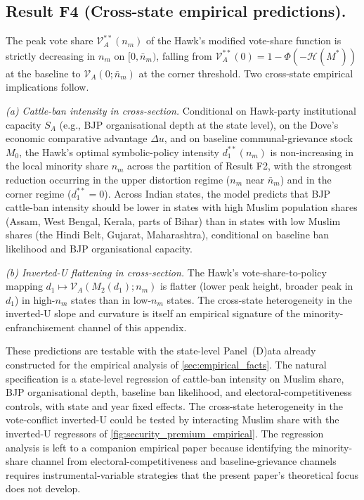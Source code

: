 \documentclass[11pt,twoside]{extarticle}
\begin{document}
\subsection*{Result F4 (Cross-state empirical predictions).} The peak vote share $\mathcal V_A^{**}(n_m)$ of the Hawk's modified vote-share function is strictly decreasing in $n_m$ on $[0,\bar n_m)$, falling from $\mathcal V_A^{**}(0)=1-\Phi(-\mathcal H(M^{*}))$ at the baseline to $\mathcal V_A(0;\bar n_m)$ at the corner threshold. Two cross-state empirical implications follow.

\medskip\noindent\textit{(a) Cattle-ban intensity in cross-section.} Conditional on Hawk-party institutional capacity $S_A$ (e.g., BJP organisational depth at the state level), on the Dove's economic comparative advantage $\Delta u$, and on baseline communal-grievance stock $M_0$, the Hawk's optimal symbolic-policy intensity $d_1^{**}(n_m)$ is non-increasing in the local minority share $n_m$ across the partition of Result F2, with the strongest reduction occurring in the upper distortion regime ($n_m$ near $\bar n_m$) and in the corner regime ($d_1^{**}=0$). Across Indian states, the model predicts that BJP cattle-ban intensity should be lower in states with high Muslim population shares (Assam, West Bengal, Kerala, parts of Bihar) than in states with low Muslim shares (the Hindi Belt, Gujarat, Maharashtra), conditional on baseline ban likelihood and BJP organisational capacity.

\medskip\noindent\textit{(b) Inverted-U flattening in cross-section.} The Hawk's vote-share-to-policy mapping $d_1\mapsto\mathcal V_A(M_2(d_1);n_m)$ is flatter (lower peak height, broader peak in $d_1$) in high-$n_m$ states than in low-$n_m$ states. The cross-state heterogeneity in the inverted-U slope and curvature is itself an empirical signature of the minority-enfranchisement channel of this appendix.

These predictions are testable with the state-level Panel~(D)ata already constructed for the empirical analysis of \autoref{sec:empirical_facts}. The natural specification is a state-level regression of cattle-ban intensity on Muslim share, BJP organisational depth, baseline ban likelihood, and electoral-competitiveness controls, with state and year fixed effects. The cross-state heterogeneity in the vote-conflict inverted-U could be tested by interacting Muslim share with the inverted-U regressors of \autoref{fig:security_premium_empirical}. The regression analysis is left to a companion empirical paper because identifying the minority-share channel from electoral-competitiveness and baseline-grievance channels requires instrumental-variable strategies that the present paper's theoretical focus does not develop.
\end{document}
